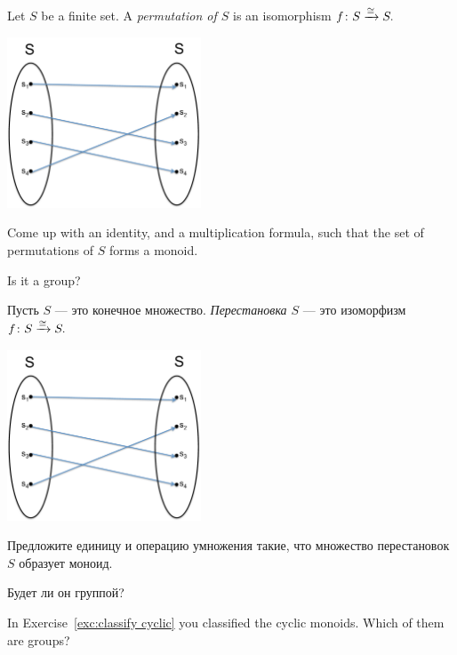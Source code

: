 \documentclass[../main/CT4S-EN-RU]{subfiles}
\begin{document}
\begin{exerciseENG}\label{exc:permutation}
Let $S$ be a finite set. A {\em permutation of $S$} is an isomorphism $f\colon S\xrightarrow{\cong}S.$ 
\begin{center}
\parbox{2.3in}{
\includegraphics[height=2in]{SetPermutation}}
\end{center}
\sexc Come up with an identity, and a  multiplication formula, such that the set of permutations of $S$ forms a monoid. 
\item Is it a group?
\endsexc
\end{exerciseENG}

\begin{exerciseRUS}\label{exc:permutation}
Пусть $S$ — это конечное множество. {\em Перестановка $S$} — это изоморфизм $f\colon S\xrightarrow{\cong}S.$ 
\begin{center}
\parbox{2.3in}{
\includegraphics[height=2in]{SetPermutation}}
\end{center}
\sexc Предложите единицу и операцию умножения такие, что множество перестановок $S$ образует моноид. 
\item Будет ли он группой?
\endsexc
\end{exerciseRUS}

\begin{exerciseENG}
In Exercise~\ref{exc:classify cyclic} you classified the cyclic monoids. Which of them are groups? 
\end{exerciseENG}
\end{document}

